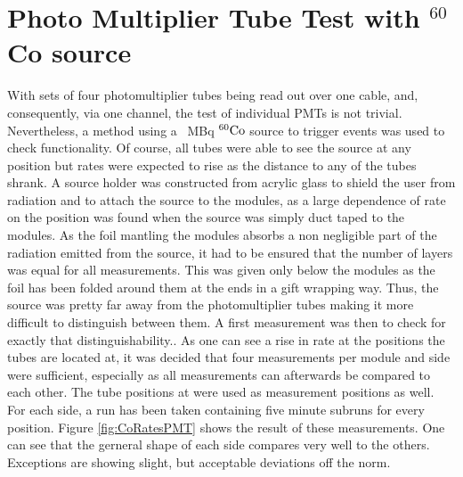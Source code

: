   \section{Photo Multiplier Tube Test with $^{60}$Co source} %
  \label{ch:Analysis:sec:PhotoMultiplierTests}
  
  With sets of four photomultiplier tubes being read out over one cable, and, consequently, via one channel, the test of individual PMTs is not trivial. Nevertheless, a method using a \SI{}{\mega\becquerel} $\rm ^{60}Co$ source to trigger events was used to check functionality. Of course, all tubes were able to see the source at any position but rates were expected to rise as the distance to any of the tubes shrank. A source holder was constructed from acrylic glass to shield the user from radiation and to attach the source to the modules, as a large dependence of rate on the position was found when the source was simply duct taped to the modules. As the foil mantling the modules absorbs a non negligible part of the radiation emitted from the source, it had to be ensured that the number of layers was equal for all measurements. This was given only below the modules as the foil has been folded around them at the ends in a gift wrapping way. Thus, the source was pretty far away from the photomultiplier tubes making it more difficult to distinguish between them. A first measurement was then to check for exactly that distinguishability..
  As one can see a rise in rate at the positions the tubes are located at, it was decided that four measurements per module and side were sufficient, especially as all measurements can afterwards be compared to each other.
  The tube positions at  were used as measurement positions as well. For each side, a run has been taken containing five minute subruns for every position. Figure \ref{fig:CoRatesPMT} shows the result of these measurements. One can see that the gerneral shape of each side compares very well to the others. Exceptions are showing slight, but acceptable deviations off the norm.
